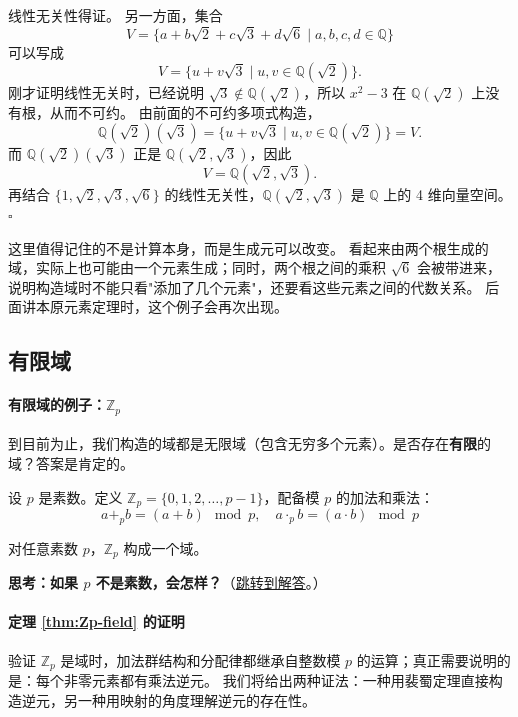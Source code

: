 线性无关性得证。
另一方面，集合
\[
V=\{a+b\sqrt{2}+c\sqrt{3}+d\sqrt{6}\mid a,b,c,d\in\mathbb{Q}\}
\]
可以写成
\[
V=\{u+v\sqrt{3}\mid u,v\in\mathbb{Q}(\sqrt{2})\}.
\]
刚才证明线性无关时，已经说明 $\sqrt{3}\notin\mathbb{Q}(\sqrt{2})$，所以 $x^2-3$ 在 $\mathbb{Q}(\sqrt{2})$ 上没有根，从而不可约。
由前面的不可约多项式构造，
\[
\mathbb{Q}(\sqrt{2})(\sqrt{3})
=\{u+v\sqrt{3}\mid u,v\in\mathbb{Q}(\sqrt{2})\}=V.
\]
而 $\mathbb{Q}(\sqrt{2})(\sqrt{3})$ 正是 $\mathbb{Q}(\sqrt{2},\sqrt{3})$，因此
\[
V=\mathbb{Q}(\sqrt{2},\sqrt{3}).
\]
再结合 $\{1,\sqrt{2},\sqrt{3},\sqrt{6}\}$ 的线性无关性，$\mathbb{Q}(\sqrt{2}, \sqrt{3})$ 是 $\mathbb{Q}$ 上的 4 维向量空间。 $\square$

这里值得记住的不是计算本身，而是生成元可以改变。
看起来由两个根生成的域，实际上也可能由一个元素生成；同时，两个根之间的乘积 $\sqrt{6}$ 会被带进来，说明构造域时不能只看"添加了几个元素"，还要看这些元素之间的代数关系。
后面讲本原元素定理时，这个例子会再次出现。

\subsection{有限域}

\paragraph*{有限域的例子：$\mathbb{Z}_p$}

到目前为止，我们构造的域都是无限域（包含无穷多个元素）。是否存在\textbf{有限}的域？答案是肯定的。

\begin{definition}[$\mathbb{Z}_p$]\label{def:Zp}
设 $p$ 是素数。定义 $\mathbb{Z}_p = \{0, 1, 2, \ldots, p-1\}$，配备模 $p$ 的加法和乘法：
\[a +_p b = (a + b) \mod p, \quad a \cdot_p b = (a \cdot b) \mod p\]
\end{definition}

\begin{theorem}[$\mathbb{Z}_p$ 是域]\label{thm:Zp-field}
对任意素数 $p$，$\mathbb{Z}_p$ 构成一个域。
\end{theorem}

\hypertarget{q:p-not-prime}{}
\medskip
\noindent\textbf{思考：如果 $p$ 不是素数，会怎样？}（\hyperlink{ans:p-not-prime}{跳转到解答}。）
\medskip

\paragraph*{定理 \ref{thm:Zp-field} 的证明}
验证 $\mathbb{Z}_p$ 是域时，加法群结构和分配律都继承自整数模 $p$ 的运算；真正需要说明的是：每个非零元素都有乘法逆元。
我们将给出两种证法：一种用裴蜀定理直接构造逆元，另一种用映射的角度理解逆元的存在性。

